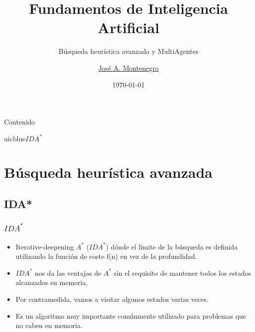 \documentclass[xcolor=table]{beamer}
\title{Fundamentos de Inteligencia Artificial}
\subtitle{Búsqueda heurística avanzada y MultiAgentes}
\author{\href{mailto:jmmontes@uma.es}{José A. Montenegro}}
\date{\today}
\begin{document}
\newtheorem{mydef}{Definición}[section] %
\maketitle






\begin{frame}{Contenido}
\tableofcontents
\end{frame}


\begin{chapter}{uicblue}{$IDA^*$}
\end{chapter}

\section{Búsqueda heurística avanzada}
\subsection{IDA*}


\begin{frame} \frametitle{$IDA^*$} \small

\begin{itemize}
    \item Iterative-deepening $A^*$ ($IDA^*$) dónde el límite de la búsqueda es definida utilizando la función de coste f(n) en vez de la profundidad.
    \item $IDA^*$ nos da las ventajas de $A^*$ sin el requisito de mantener todos los estados alcanzados en memoria, 
    \item Por contramedida, vamos a visitar algunos estados varias veces. 
    \item Es un algoritmo muy importante comúnmente utilizado para problemas que no caben en memoria.

\end{itemize}
\end{frame} 
\end{document}
